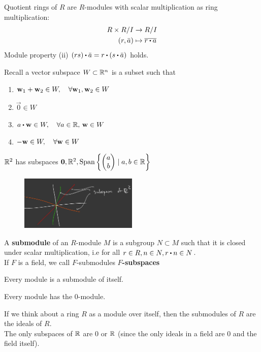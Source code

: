 \documentclass[../Main.tex]{subfiles}
\begin{document}
\begin{example}
	Quotient rings of $R$ are $R$-modules with scalar multiplication as ring multiplication:
	\begin{align*}
	R\times R/I &\to R/I\\
	(r,\bar{a}) &\mapsto \obar{r\rdot a}
	\end{align*}
	\Exr Module property (ii) $(rs)\rdot \bar{a}=r\rdot (s\rdot \bar{a})$ holds.
\end{example}
Recall a vector subspace $W\subset \mathbb{R}^n$ is a subset such that
\begin{enumerate}[label = (\roman*)]
	\item $\mathbf{w}_1+\mathbf{w}_2 \in W, \quad \forall \mathbf{w}_1, \mathbf{w}_2 \in W$
	\item $\vec{0}\in W$
	\item $a\rdot \vw \in W, \quad \forall a \in \R, \,\vw \in W$
	\item $-\mathbf{w} \in W, \quad \forall \mathbf{w} \in W$
\end{enumerate}
\begin{example}
	$\mathbb{R}^2$ has subspaces $\mathbf{0},\mathbb{R}^2,\operatorname{Span} \left\{\begin{pmatrix}
	a\\b
	\end{pmatrix} \mid a,b\in \mathbb{R}\right\}$
	\begin{figure}[!h]
		\centering
		\includegraphics[width=0.5\textwidth]{Subspace}
	\end{figure}
\end{example}
\begin{dfn}[title = {Submodule, Subspace}]
	A \textbf{submodule} of an $R$-module $M$ is a subgroup $N\subset M$ such that it is closed under scalar multiplication, i.e for all $r\in R, n\in N, r\rdot n\in N$.\\
	If $F$ is a field, we call $F$-submodules \textbf{$F$-subspaces}
\end{dfn}
\begin{example}
	Every module is a submodule of itself.
\end{example}
\begin{example}
	Every module has the $0$-module.
\end{example}
\begin{example}
	If we think about a ring $R$ as a module over itself, then the submodules of $R$ are the ideals of $R$.\\
	\Note The only subspaces of $\mathbb{R}$ are $0$ or $\mathbb{R}$ (since the only ideals in a field are $0$ and the field itself).
\end{example}
\end{document}

